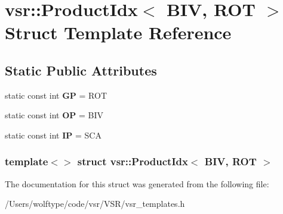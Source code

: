 \hypertarget{structvsr_1_1_product_idx_3_01_b_i_v_00_01_r_o_t_01_4}{\section{vsr\-:\-:Product\-Idx$<$ B\-I\-V, R\-O\-T $>$ Struct Template Reference}
\label{structvsr_1_1_product_idx_3_01_b_i_v_00_01_r_o_t_01_4}
}
\subsection*{Static Public Attributes}
\begin{DoxyCompactItemize}
\item 
\hypertarget{structvsr_1_1_product_idx_3_01_b_i_v_00_01_r_o_t_01_4_acc00faac50ceffa27bf1d657aafb6c29}{static const int {\bfseries G\-P} = R\-O\-T}\label{structvsr_1_1_product_idx_3_01_b_i_v_00_01_r_o_t_01_4_acc00faac50ceffa27bf1d657aafb6c29}

\item 
\hypertarget{structvsr_1_1_product_idx_3_01_b_i_v_00_01_r_o_t_01_4_ac10d8a110df20eb4a712e08baf59f43e}{static const int {\bfseries O\-P} = B\-I\-V}\label{structvsr_1_1_product_idx_3_01_b_i_v_00_01_r_o_t_01_4_ac10d8a110df20eb4a712e08baf59f43e}

\item 
\hypertarget{structvsr_1_1_product_idx_3_01_b_i_v_00_01_r_o_t_01_4_aa9b31f3f9b151d530c28646721575282}{static const int {\bfseries I\-P} = S\-C\-A}\label{structvsr_1_1_product_idx_3_01_b_i_v_00_01_r_o_t_01_4_aa9b31f3f9b151d530c28646721575282}

\end{DoxyCompactItemize}
\subsubsection*{template$<$$>$ struct vsr\-::\-Product\-Idx$<$ B\-I\-V, R\-O\-T $>$}



The documentation for this struct was generated from the following file\-:\begin{DoxyCompactItemize}
\item 
/\-Users/wolftype/code/vsr/\-V\-S\-R/vsr\-\_\-templates.\-h\end{DoxyCompactItemize}
